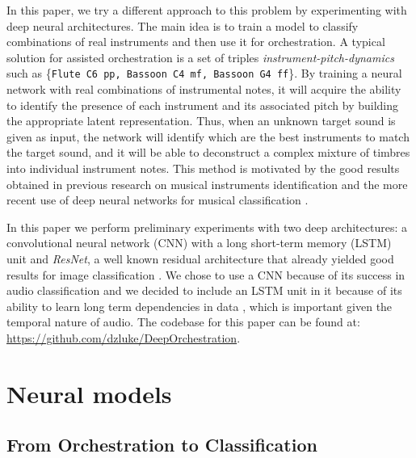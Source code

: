 \documentclass[runningheads,a4paper]{llncs}
\begin{document}
In this paper, we try a different approach to this problem by experimenting with deep neural architectures. The main idea is to train a model to classify combinations of real instruments and then use it for orchestration. A typical solution for assisted orchestration is a set of triples \emph{instrument-pitch-dynamics} such as \{\texttt{Flute C6 pp, Bassoon C4 mf, Bassoon G4 ff}\}. By training a neural network with real combinations of instrumental notes, it will acquire the ability to identify the presence of each instrument and its associated pitch by building the appropriate latent representation. Thus, when an unknown target sound is given as input, the network will identify which are the best instruments to match the target sound, and it will be able to  deconstruct a complex mixture of timbres into individual instrument notes. This method is motivated by the good results obtained in previous research on musical instruments identification \cite{Benetos07, Kitahara05} and the more recent use of deep neural networks for musical classification \cite{lostanlen16, Bian19}. 

In this paper we perform preliminary experiments with two deep architectures: a convolutional neural network (CNN) with a long short-term memory (LSTM) unit and \emph{ResNet}, a well known residual architecture that already yielded good results for image classification \cite{He15}. We chose to use a CNN because of its success in audio classification \cite{Hershey17} and we decided to include an LSTM unit in it because of its ability to learn long term dependencies in data \cite{Hochreiter97}, which is important given the temporal nature of audio. The codebase for this paper can be found at: \url{https://github.com/dzluke/DeepOrchestration}.
\\

\section{Neural models}
\label{sec:models}



\subsection{From Orchestration to Classification}
\end{document}
